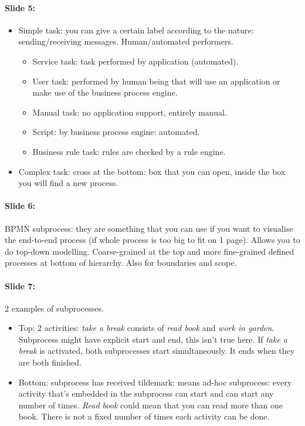 \documentclass[10pt,a4paper]{report}
\begin{document}
\paragraph{Slide 5:}
\begin{itemize}
\item Simple task: you can give a certain label according to the nature: sending/receiving messages. Human/automated performers.\\
\begin{itemize}
\item Service task: task performed by application (automated). 
\item User task: performed by human being that will use an application or make use of the business process engine. 
\item Manual task: no application support, entirely manual. 
\item Script: by business process engine: automated. 
\item Business rule task: rules are checked by a rule engine.
\end{itemize}
\item Complex task: cross at the bottom: box that you can open, inside the box you will find a new process.
\end{itemize}

\paragraph{Slide 6:}BPMN subprocess: they are something that you can use if you want to visualise the end-to-end process (if whole process is too big to fit on 1 page). Allows you to do top-down modelling. Coarse-grained at the top and more fine-grained defined processes at bottom of hierarchy. Also for boundaries and scope.

\paragraph{Slide 7:}2 examples of subprocesses.
\begin{itemize}
\item Top: 2 activities: \textit{take a break} consists of \textit{read book} and \textit{work in garden}. Subprocess might have explicit start and end, this isn't true here. If \textit{take a break} is activated, both subprocesses start simultaneously. It ends when they are both finished. 
\item Bottom: subprocess has received tildemark: means ad-hoc subprocess: every activity that's embedded in the subprocess can start and can start any number of times. \textit{Read book} could mean that you can read more than one book. There is not a fixed number of times each activity can be done.
\end{itemize}
\end{document}
